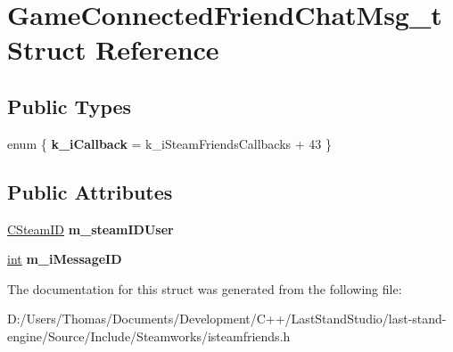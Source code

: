 \hypertarget{structGameConnectedFriendChatMsg__t}{}\section{Game\+Connected\+Friend\+Chat\+Msg\+\_\+t Struct Reference}
\label{structGameConnectedFriendChatMsg__t}
\subsection*{Public Types}
\begin{DoxyCompactItemize}
\item 
\hypertarget{structGameConnectedFriendChatMsg__t_a55b2de2e58b7e4450201e421cae12224}{}enum \{ {\bfseries k\+\_\+i\+Callback} = k\+\_\+i\+Steam\+Friends\+Callbacks + 43
 \}\label{structGameConnectedFriendChatMsg__t_a55b2de2e58b7e4450201e421cae12224}

\end{DoxyCompactItemize}
\subsection*{Public Attributes}
\begin{DoxyCompactItemize}
\item 
\hypertarget{structGameConnectedFriendChatMsg__t_a3e41fe3f474ceab3f22999e714b3bb30}{}\hyperlink{classCSteamID}{C\+Steam\+I\+D} {\bfseries m\+\_\+steam\+I\+D\+User}\label{structGameConnectedFriendChatMsg__t_a3e41fe3f474ceab3f22999e714b3bb30}

\item 
\hypertarget{structGameConnectedFriendChatMsg__t_add465c6a6e103119e9531527491dc650}{}\hyperlink{SDL__thread_8h_a6a64f9be4433e4de6e2f2f548cf3c08e}{int} {\bfseries m\+\_\+i\+Message\+I\+D}\label{structGameConnectedFriendChatMsg__t_add465c6a6e103119e9531527491dc650}

\end{DoxyCompactItemize}


The documentation for this struct was generated from the following file\+:\begin{DoxyCompactItemize}
\item 
D\+:/\+Users/\+Thomas/\+Documents/\+Development/\+C++/\+Last\+Stand\+Studio/last-\/stand-\/engine/\+Source/\+Include/\+Steamworks/isteamfriends.\+h\end{DoxyCompactItemize}
